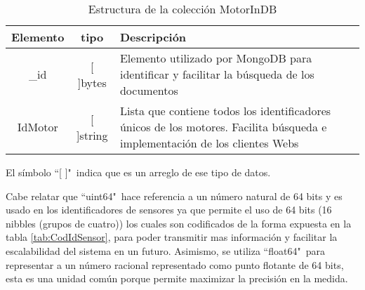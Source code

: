 \vspace{1cm}


    \begin{table}[ht]
        \begin{center}
        \caption[Estructura de MotorInDB]{Estructura de la colección MotorInDB}
        \label{tab:MotorInDBbson}
            \vspace{0.3cm}
            \begin{tabular}{|c|c|p{11cm}|}
                \hline
                Elemento & tipo     & Descripción \\\hline\hline
                \_id      & [ ]bytes  & Elemento utilizado por MongoDB para
                identificar y facilitar la búsqueda de los documentos\\\hline
                IdMotor  & [ ]string & Lista que contiene todos los identificadores
                únicos de los motores. Facilita búsqueda e implementación de los
                clientes Webs\\\hline
            \end{tabular}

            \vspace{0.5cm}
            El símbolo ``[ ]"\ indica que es un arreglo de ese tipo de datos.
        \end{center}
    \end{table}

    Cabe relatar que ``uint64"\  hace referencia a un número natural de 64 bits
    y es usado en los identificadores de sensores ya que permite el uso de 64
    bits (16 nibbles (grupos de cuatro)) los cuales son codificados de
    la forma expuesta en la tabla      \ref{tab:CodIdSensor}, para
    poder transmitir mas información y facilitar la escalabilidad del sistema en
    un futuro.
    Asimismo, se utiliza
    ``float64"\ para representar  a un número racional representado como punto
    flotante de 64 bits, esta es una unidad común porque permite maximizar la
    precisión en la medida.


